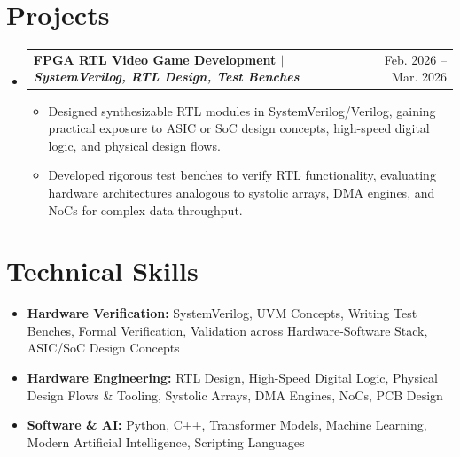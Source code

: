 \documentclass[letterpaper,12pt]{article}
\makeatletter
\newcommand{\resumeItem}[1]{\item{#1}}
\newcommand{\resumeProjectHeading}[2]{
  \item
    \begin{tabular*}{0.97\textwidth}[t]{l@{\extracolsep{\fill}}r}
      \textbf{#1} & #2 \\
    \end{tabular*}
}
\newcommand{\resumeSubHeadingListStart}{\begin{itemize}[label=\textbullet]}
\newcommand{\resumeSubHeadingListEnd}{\end{itemize}}
\newcommand{\resumeItemListStart}{\begin{itemize}[label=-]}
\newcommand{\resumeItemListEnd}{\end{itemize}}
\makeatother
\begin{document}
\section{Projects}
\resumeSubHeadingListStart
  \resumeProjectHeading{FPGA RTL Video Game Development $\vert$ \emph{SystemVerilog, RTL Design, Test Benches}}{Feb. 2026 -- Mar. 2026}
  \resumeItemListStart
    \resumeItem{Designed synthesizable RTL modules in SystemVerilog/Verilog, gaining practical exposure to ASIC or SoC design concepts, high-speed digital logic, and physical design flows.}
    \resumeItem{Developed rigorous test benches to verify RTL functionality, evaluating hardware architectures analogous to systolic arrays, DMA engines, and NoCs for complex data throughput.}
  \resumeItemListEnd
\resumeSubHeadingListEnd

\section{Technical Skills}
\resumeSubHeadingListStart
  \item{\textbf{Hardware Verification:} SystemVerilog, UVM Concepts, Writing Test Benches, Formal Verification, Validation across Hardware-Software Stack, ASIC/SoC Design Concepts}
  \item{\textbf{Hardware Engineering:} RTL Design, High-Speed Digital Logic, Physical Design Flows \& Tooling, Systolic Arrays, DMA Engines, NoCs, PCB Design}
  \item{\textbf{Software \& AI:} Python, C++, Transformer Models, Machine Learning, Modern Artificial Intelligence, Scripting Languages}
\resumeSubHeadingListEnd
\end{document}
